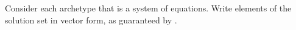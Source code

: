 Consider each archetype that is a system of equations. Write elements of the solution set in vector form, as guaranteed by .\\
\\ 
\\ 
\\ 
\\ 
\\ 
\\ 
\\ 
\\ 
\\

